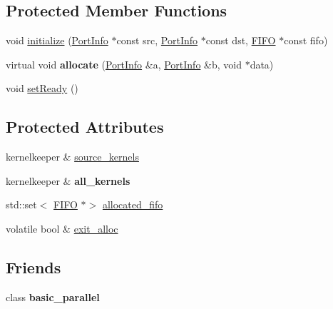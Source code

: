 \subsection*{Protected Member Functions}
\begin{DoxyCompactItemize}
\item 
void \hyperlink{class_allocate_a1d5c71b5cd6fc9671ed82d9c1d04965c}{initialize} (\hyperlink{struct_port_info}{Port\+Info} $\ast$const src, \hyperlink{struct_port_info}{Port\+Info} $\ast$const dst, \hyperlink{class_f_i_f_o}{F\+I\+FO} $\ast$const fifo)
\item 
\hypertarget{class_allocate_a901eb0fdb6cffd56019c9ab9f2b25f92}{}\label{class_allocate_a901eb0fdb6cffd56019c9ab9f2b25f92} 
virtual void {\bfseries allocate} (\hyperlink{struct_port_info}{Port\+Info} \&a, \hyperlink{struct_port_info}{Port\+Info} \&b, void $\ast$data)
\item 
void \hyperlink{class_allocate_a4cf36bb704e43f5736a0e736d9e1a81b}{set\+Ready} ()
\end{DoxyCompactItemize}
\subsection*{Protected Attributes}
\begin{DoxyCompactItemize}
\item 
kernelkeeper \& \hyperlink{class_allocate_a93e612d7ea7eb686fc88b5dee7a1407b}{source\+\_\+kernels}
\item 
\hypertarget{class_allocate_a91e8c7d69ab7b309ea45439aea54fb4f}{}\label{class_allocate_a91e8c7d69ab7b309ea45439aea54fb4f} 
kernelkeeper \& {\bfseries all\+\_\+kernels}
\item 
std\+::set$<$ \hyperlink{class_f_i_f_o}{F\+I\+FO} $\ast$$>$ \hyperlink{class_allocate_a037410210c0d10578f87de1ec68f47ba}{allocated\+\_\+fifo}
\item 
volatile bool \& \hyperlink{class_allocate_a4d10076b88ab1297c89b8a05e117b510}{exit\+\_\+alloc}
\end{DoxyCompactItemize}
\subsection*{Friends}
\begin{DoxyCompactItemize}
\item 
\hypertarget{class_allocate_a901ac6fe1c35f3c114cf9e83f75dde0c}{}\label{class_allocate_a901ac6fe1c35f3c114cf9e83f75dde0c} 
class {\bfseries basic\+\_\+parallel}
\end{DoxyCompactItemize}



